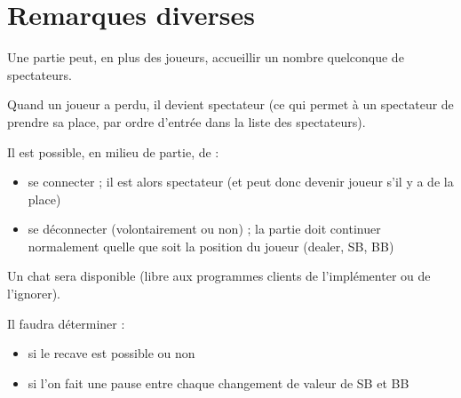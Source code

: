 \documentclass[a4paper]{article}
\begin{document}
\section{Remarques diverses}

Une partie peut, en plus des joueurs, accueillir un nombre quelconque de spectateurs.

Quand un joueur a perdu, il devient spectateur (ce qui permet à un spectateur de prendre sa place, par ordre d'entrée dans la liste des spectateurs).

Il est possible, en milieu de partie, de :
\begin{itemize}
	\item se connecter ; il est alors spectateur (et peut donc devenir joueur s'il y a de la place)
	\item se déconnecter (volontairement ou non) ; la partie doit continuer normalement quelle que soit la position du joueur (dealer, SB, BB)
\end{itemize}

Un chat sera disponible (libre aux programmes clients de l'implémenter ou de l'ignorer).

Il faudra déterminer :
\begin{itemize}
	\item si le recave est possible ou non
	\item si l'on fait une pause entre chaque changement de valeur de SB et BB
\end{itemize}
\end{document}
